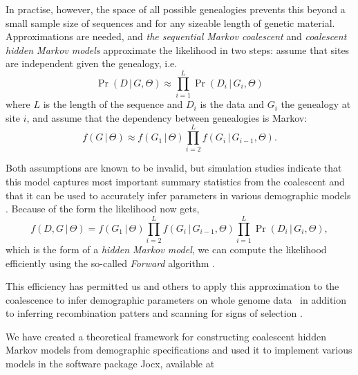 \documentclass[graybox]{svmult}
\begin{document}
In practise, however, the space of all possible genealogies prevents this beyond a small sample size of sequences and for any sizeable length of genetic material. Approximations are needed, and \emph{the sequential Markov coalescent} and \emph{coalescent hidden Markov models} approximate the likelihood in two steps: assume that sites are independent given the genealogy, i.e.
\begin{equation}
  \Pr(D\,|\,G,\Theta) \approx
  \prod_{i=1}^L \Pr(D_i\,|\,G_i,\Theta)
\end{equation}
where $L$ is the length of the sequence and $D_i$ is the data and $G_i$ the genealogy at site $i$, and assume that the dependency between genealogies is Markov:
\begin{equation}
  \label{eq:markov-genealogy}
  f(G\,|\,\Theta) \approx
  f(G_1\,|\,\Theta)\prod_{i=2}^{L}f(G_{i}\,|\,G_{i-1},\Theta)
  .
\end{equation}

Both assumptions are known to be invalid, but simulation studies indicate that this model captures most important summary statistics from the coalescent \cite{McVean:2005hoa,Marjoram:2006hpa} and that it can be used to accurately infer parameters in various demographic models \cite{Mailund:2011dva,Mailund:2012ewa,Cheng:2015kia}. Because of the form the likelihood now gets,
\begin{equation}
  \label{eq:coalhmm-joint-probability}
  f(D,G\,|\,\Theta) = 
  	f(G_1\,|\,\Theta)
  	\prod_{i=2}^{L}f(G_{i}\,|\,G_{i-1},\Theta)
  	\prod_{i=1}^L \Pr(D_i\,|\,G_i,\Theta)
  	,
\end{equation}
which is the form of a \emph{hidden Markov model}, we can compute the likelihood efficiently using the so-called \emph{Forward} algorithm \cite[chapter 3]{durbin1998biological}.


This efficiency has permitted us and others to apply this approximation to the coalescence to infer demographic parameters on whole genome data~\cite{Li:2011eza,Locke:2011gna, Hobolth:2011dia, Scally:2012ika, Prufer:2012ea, Miller:2012cxa, Abascal:2016cy, PradoMartinez:2013dna, Jonsson:2014fga} in addition to inferring recombination patters \cite{Munch:2014cba,Munch:2014cwa} and scanning for signs of selection \cite{Dutheil:2015kl,Munch:2016dn}.

We have created a theoretical framework for constructing coalescent hidden Markov models from demographic specifications \cite{Mailund:2011dva,Mailund:2012ewa,Mailund2012,Cheng:2015kia} and used it to implement various models in the software package Jocx, available at 
\end{document}
